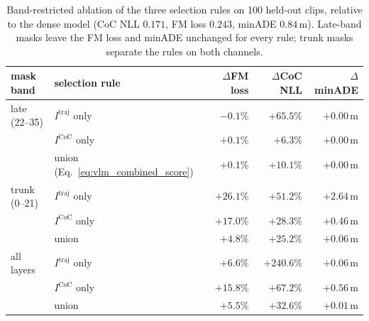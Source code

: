 \begin{table}[t]
\centering
\small
\caption{Band-restricted ablation of the three selection rules on 100 held-out clips, relative to the dense model (CoC NLL $0.171$, FM loss $0.243$, minADE $0.84$\,m). Late-band masks leave the FM loss and minADE unchanged for every rule; trunk masks separate the rules on both channels.}
\label{tab:band_ablation}
\begin{tabular}{llrrr}
\toprule
mask band & selection rule & $\Delta$FM loss & $\Delta$CoC NLL & $\Delta$minADE \\
\midrule
late (22--35) & $I^{\mathrm{traj}}$ only & $-0.1\%$ & $+65.5\%$ & $+0.00$\,m \\
              & $I^{\mathrm{CoC}}$ only  & $+0.1\%$ & $+6.3\%$  & $+0.00$\,m \\
              & union (Eq.~\ref{eq:vlm_combined_score}) & $+0.1\%$ & $+10.1\%$ & $+0.00$\,m \\
\midrule
trunk (0--21) & $I^{\mathrm{traj}}$ only & $+26.1\%$ & $+51.2\%$ & $+2.64$\,m \\
              & $I^{\mathrm{CoC}}$ only  & $+17.0\%$ & $+28.3\%$ & $+0.46$\,m \\
              & union                    & $+4.8\%$  & $+25.2\%$ & $+0.06$\,m \\
\midrule
all layers    & $I^{\mathrm{traj}}$ only & $+6.6\%$  & $+240.6\%$ & $+0.06$\,m \\
              & $I^{\mathrm{CoC}}$ only  & $+15.8\%$ & $+67.2\%$  & $+0.56$\,m \\
              & union                    & $+5.5\%$  & $+32.6\%$  & $+0.01$\,m \\
\bottomrule
\end{tabular}
\end{table}

